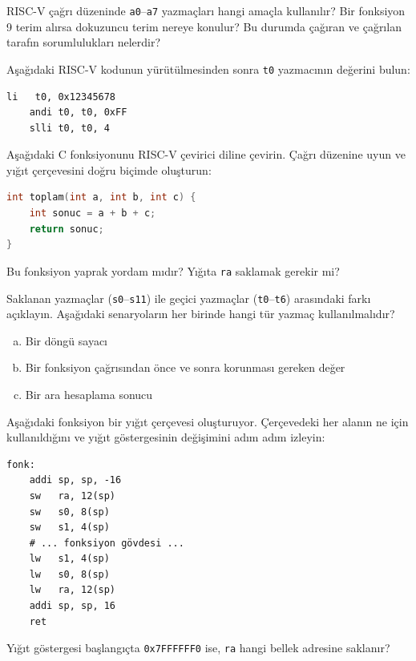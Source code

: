 \begin{alistirma}[\kolay]
RISC-V çağrı düzeninde \texttt{a0}--\texttt{a7} yazmaçları hangi amaçla kullanılır? Bir fonksiyon 9 terim alırsa dokuzuncu terim nereye konulur? Bu durumda çağıran ve çağrılan tarafın sorumlulukları nelerdir?
\end{alistirma}

\begin{alistirma}[\kolay]
Aşağıdaki RISC-V kodunun yürütülmesinden sonra \texttt{t0} yazmacının değerini bulun:
\begin{lstlisting}[style=riscv]
    li   t0, 0x12345678
    andi t0, t0, 0xFF
    slli t0, t0, 4
\end{lstlisting}
\end{alistirma}

\begin{alistirma}[\orta]
Aşağıdaki C fonksiyonunu RISC-V çevirici diline çevirin. Çağrı düzenine uyun ve yığıt çerçevesini doğru biçimde oluşturun:
\begin{lstlisting}[language=C, style=alistirma-kod]
int toplam(int a, int b, int c) {
    int sonuc = a + b + c;
    return sonuc;
}
\end{lstlisting}
Bu fonksiyon yaprak yordam mıdır? Yığıta \texttt{ra} saklamak gerekir mi?
\end{alistirma}

\begin{alistirma}[\orta]
Saklanan yazmaçlar (\texttt{s0}--\texttt{s11}) ile geçici yazmaçlar (\texttt{t0}--\texttt{t6}) arasındaki farkı açıklayın. Aşağıdaki senaryoların her birinde hangi tür yazmaç kullanılmalıdır?
\begin{enumerate}[(a)]
\item Bir döngü sayacı
\item Bir fonksiyon çağrısından önce ve sonra korunması gereken değer
\item Bir ara hesaplama sonucu
\end{enumerate}
\end{alistirma}

\begin{alistirma}[\orta]
Aşağıdaki fonksiyon bir yığıt çerçevesi oluşturuyor. Çerçevedeki her alanın ne için kullanıldığını ve yığıt göstergesinin değişimini adım adım izleyin:
\begin{lstlisting}[style=riscv]
fonk:
    addi sp, sp, -16
    sw   ra, 12(sp)
    sw   s0, 8(sp)
    sw   s1, 4(sp)
    # ... fonksiyon gövdesi ...
    lw   s1, 4(sp)
    lw   s0, 8(sp)
    lw   ra, 12(sp)
    addi sp, sp, 16
    ret
\end{lstlisting}
Yığıt göstergesi başlangıçta \texttt{0x7FFFFFF0} ise, \texttt{ra} hangi bellek adresine saklanır?
\end{alistirma}


